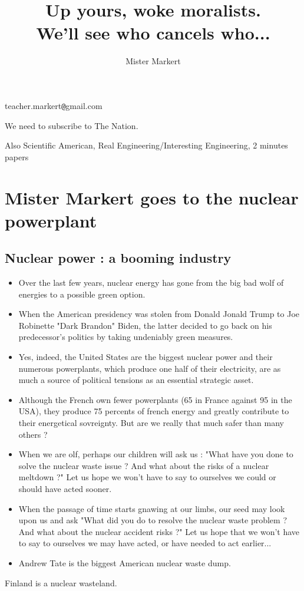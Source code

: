 \documentclass[a4paper,12pt]{book}
\title{Up yours, woke moralists. \\ We'll see who cancels who...}
\author{Mister Markert}
\begin{document}
\maketitle
\tableofcontents
teacher.markert\texttt{@}gmail.com
\par We need to subscribe to The Nation.
\par Also Scientific American, Real Engineering/Interesting Engineering, 2 minutes papers

\chapter{Mister Markert goes to the nuclear powerplant}
\section{Nuclear power : a booming industry}
\begin{itemize}
\item Over the last few years, nuclear energy has gone from the big bad wolf of energies to a possible green option.
\item When the American presidency was stolen from Donald Jonald Trump to Joe Robinette "Dark Brandon" Biden, the latter decided to go back on his predecessor's politics by taking undeniably green measures.
\item Yes, indeed, the United States are the biggest nuclear power and their numerous powerplants, which produce one half of their electricity, are as much a source of political tensions as an essential strategic asset.
\item Although the French own fewer powerplants (65 in France against 95 in the USA), they produce 75 percents of french energy and greatly contribute to their energetical sovreignty. But are we really that much safer than many others ?
\item When we are olf, perhaps our children will ask us : "What have you done to solve the nuclear waste issue ? And what about the risks of a nuclear meltdown ?" Let us hope we won't have to say to ourselves we could or should have acted sooner.
\item When the passage of time starts gnawing at our limbs, our seed may look upon us and ask "What did you do to resolve the nuclear waste problem ? And what about the nuclear accident risks ?" Let us hope that we won't have to say to ourselves we may have acted, or have needed to act earlier...
\item Andrew Tate is the biggest American nuclear waste dump.
\end{itemize}
Finland is a nuclear wasteland.
\end{document}
